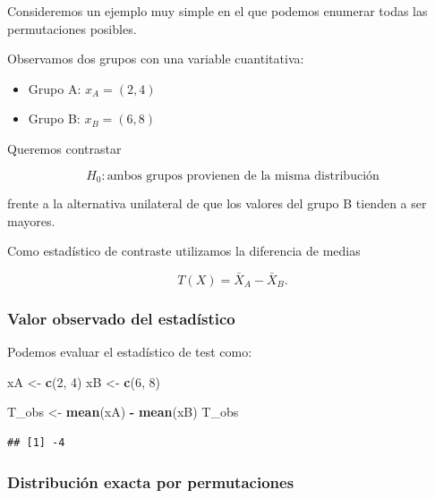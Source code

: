 \documentclass[
]{article}
\newenvironment{Shaded}{\begin{snugshade}}{\end{snugshade}}
\newcommand{\DecValTok}[1]{\textcolor[rgb]{0.00,0.00,0.81}{#1}}
\newcommand{\FunctionTok}[1]{\textcolor[rgb]{0.13,0.29,0.53}{\textbf{#1}}}
\newcommand{\NormalTok}[1]{#1}
\newcommand{\OtherTok}[1]{\textcolor[rgb]{0.56,0.35,0.01}{#1}}
\newcommand{\SpecialCharTok}[1]{\textcolor[rgb]{0.81,0.36,0.00}{\textbf{#1}}}
\providecommand{\tightlist}{%
  \setlength{\itemsep}{0pt}\setlength{\parskip}{0pt}}
\begin{document}
Consideremos un ejemplo muy simple en el que podemos enumerar todas las permutaciones posibles.

Observamos dos grupos con una variable cuantitativa:

\begin{itemize}
\tightlist
\item
  Grupo A: \(x_A=(2,4)\)\\
\item
  Grupo B: \(x_B=(6,8)\)
\end{itemize}

Queremos contrastar

\[
H_0:\text{ambos grupos provienen de la misma distribución}
\]

frente a la alternativa unilateral de que los valores del grupo B tienden a ser mayores.

Como estadístico de contraste utilizamos la diferencia de medias

\[
T(X)=\bar X_A-\bar X_B.
\]

\subsubsection{Valor observado del estadístico}\label{valor-observado-del-estaduxedstico}

Podemos evaluar el estadístico de test como:

\begin{Shaded}
\begin{Highlighting}[]
\NormalTok{xA }\OtherTok{\textless{}{-}} \FunctionTok{c}\NormalTok{(}\DecValTok{2}\NormalTok{, }\DecValTok{4}\NormalTok{)}
\NormalTok{xB }\OtherTok{\textless{}{-}} \FunctionTok{c}\NormalTok{(}\DecValTok{6}\NormalTok{, }\DecValTok{8}\NormalTok{)}

\NormalTok{T\_obs }\OtherTok{\textless{}{-}} \FunctionTok{mean}\NormalTok{(xA) }\SpecialCharTok{{-}} \FunctionTok{mean}\NormalTok{(xB)}
\NormalTok{T\_obs}
\end{Highlighting}
\end{Shaded}

\begin{verbatim}
## [1] -4
\end{verbatim}

\subsubsection{Distribución exacta por permutaciones}\label{distribuciuxf3n-exacta-por-permutaciones}
\end{document}
